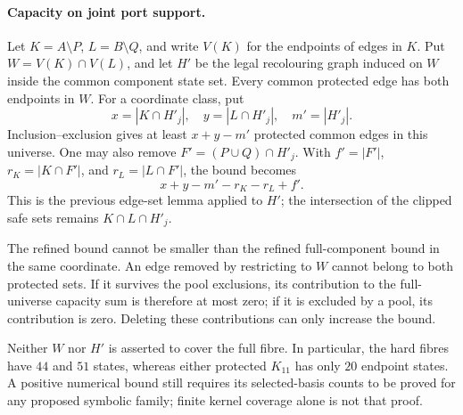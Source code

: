 \paragraph{Capacity on joint port support.}
Let $K=A\setminus P$, $L=B\setminus Q$, and write $V(K)$ for the
endpoints of edges in $K$. Put $W=V(K)\cap V(L)$, and let $H'$ be
the legal recolouring graph induced on $W$ inside the common component
state set. Every common protected edge has both endpoints in $W$.
For a coordinate class, put
\[
x=|K\cap H'_j|,\quad y=|L\cap H'_j|,\quad m'=|H'_j|.
\]
Inclusion--exclusion gives at least $x+y-m'$ protected common edges
in this universe. One may also remove
$F'=(P\cup Q)\cap H'_j$. With $f'=|F'|$,
$r_K=|K\cap F'|$, and $r_L=|L\cap F'|$, the bound becomes
\[
x+y-m'-r_K-r_L+f'.
\]
This is the previous edge-set lemma applied to $H'$; the intersection
of the clipped safe sets remains $K\cap L\cap H'_j$.

The refined bound cannot be smaller than the refined full-component
bound in the same coordinate. An edge removed by restricting to $W$
cannot belong to both protected sets. If it survives the pool exclusions,
its contribution to the full-universe capacity sum is therefore at most
zero; if it is excluded by a pool, its contribution is zero. Deleting
these contributions can only increase the bound.

Neither $W$ nor $H'$ is asserted to cover the full fibre. In particular,
the hard fibres have $44$ and $51$ states, whereas either protected
$K_{11}$ has only $20$ endpoint states. A positive numerical bound
still requires its selected-basis counts to be proved for any proposed
symbolic family; finite kernel coverage alone is not that proof.
